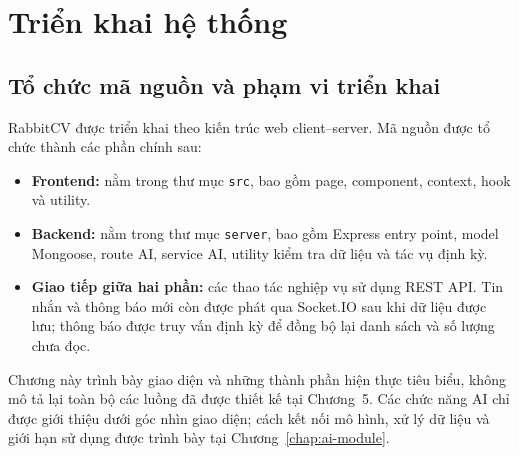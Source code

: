 \chapter{Triển khai hệ thống}
\label{chap:system-implementation}

\setlength{\intextsep}{8pt plus 2pt minus 2pt}
\setlength{\abovecaptionskip}{4pt}
\setlength{\belowcaptionskip}{2pt}

\section{Tổ chức mã nguồn và phạm vi triển khai}

RabbitCV được triển khai theo kiến trúc web client--server. Mã nguồn được tổ chức thành các phần chính sau:

\begin{itemize}
    \item \textbf{Frontend:} nằm trong thư mục \texttt{src}, bao gồm page, component, context, hook và utility.
    \item \textbf{Backend:} nằm trong thư mục \texttt{server}, bao gồm Express entry point, model Mongoose, route AI, service AI, utility kiểm tra dữ liệu và tác vụ định kỳ.
    \item \textbf{Giao tiếp giữa hai phần:} các thao tác nghiệp vụ sử dụng REST API. Tin nhắn và thông báo mới còn được phát qua Socket.IO sau khi dữ liệu được lưu; thông báo được truy vấn định kỳ để đồng bộ lại danh sách và số lượng chưa đọc.
\end{itemize}

Chương này trình bày giao diện và những thành phần hiện thực tiêu biểu, không mô tả lại toàn bộ các luồng đã được thiết kế tại Chương~5. Các chức năng AI chỉ được giới thiệu dưới góc nhìn giao diện; cách kết nối mô hình, xử lý dữ liệu và giới hạn sử dụng được trình bày tại Chương~\ref{chap:ai-module}.

